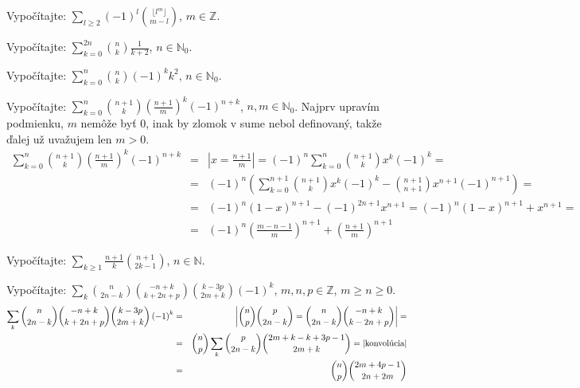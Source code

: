\pr Vypočítajte: $\sum_{l\geq 2}\left(-1\right)^l{\lfloor l^m \rfloor \choose m-l}$, $m\in\mathbb{Z}$.

\pr Vypočítajte: $\sum_{k=0}^{2n}{n \choose k}\frac1{k+2}$, $n\in\mathbb{N}_0$.

\pr Vypočítajte: $\sum_{k=0}^{n}{n \choose k}\left(-1\right)^k k^2$, $n\in\mathbb{N}_0$.

\pr Vypočítajte: $\sum_{k=0}^{n}{n+1 \choose k}\left(\frac{n+1}m\right)^k \left(-1\right)^{n+k}$, $n,m\in\mathbb{N}_0$.
 Najprv upravím podmienku, $m$ nemôže byť $0$, inak by zlomok v sume nebol definovaný, takže ďalej už uvažujem len $m>0$.
\begin{eqnarray*}
\sum_{k=0}^{n}{n+1 \choose k}\left(\frac{n+1}m\right)^k \left(-1\right)^{n+k} &=& \left| x = \frac{n+1}m \right| = \left(-1\right)^n\sum_{k=0}^n{n+1 \choose k}x^k\left(-1\right)^k =\\
&=& \left(-1\right)^n\left(\sum_{k=0}^{n+1}{n+1 \choose k}x^k\left(-1\right)^k - {n+1 \choose n+1}x^{n+1}\left(-1\right)^{n+1}\right) = \\
&=& \left(-1\right)^n\left(1-x\right)^{n+1} - \left(-1\right)^{2n+1}x^{n+1} = \left(-1\right)^n\left(1-x\right)^{n+1}+x^{n+1} = \\
&=& \left(-1\right)^n\left(\frac{m-n-1}m\right)^{n+1}+\left(\frac{n+1}m\right)^{n+1}
\end{eqnarray*}

\pr Vypočítajte: $\sum_{k\geq1}\frac{n+1}k{n+1 \choose 2k-1}$, $n\in\mathbb{N}$.

\pr Vypočítajte: $\sum_k{n \choose 2n-k}{-n+k \choose k+2n+p}{k-3p \choose 2m+k}\left(-1\right)^k$, $m,n,p\in\mathbb{Z}$, $m\geq n\geq 0$.
\begin{eqnarray*}
\sum_k{n \choose 2n-k}{-n+k \choose k+2n+p}{k-3p \choose 2m+k}\left(-1\right)^k &=& \left| {n \choose p}{p \choose 2n-k} = {n \choose 2n-k}{-n+k \choose k-2n+p}\right| = \\
&=& {n \choose p}\sum_k{p \choose 2n-k}{2m+k-k+3p-1 \choose 2m+k} = |\hbox{konvolúcia}|\\
&=& {n \choose p}{2m+4p-1 \choose 2n+2m}
\end{eqnarray*}

